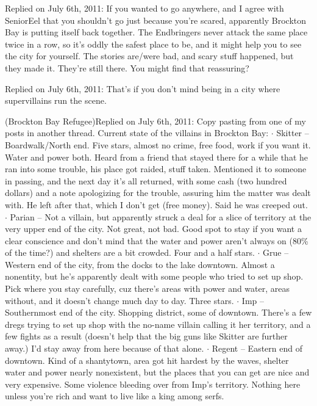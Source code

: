 \blacktriangleright  {}
Replied on July 6th, 2011:
If you wanted to go anywhere, and I agree with SeniorEel that you shouldn't go just because you're scared, apparently Brockton Bay is putting itself back together.  The Endbringers never attack the same place twice in a row, so it's oddly the safest place to be, and it might help you to see the city for yourself.  The stories are/were bad, and scary stuff happened, but they made it.  They're still there.  You might find that reassuring?



\blacktriangleright  {}
Replied on July 6th, 2011:
That's if you don't mind being in a city where supervillains run the scene.



\blacktriangleright {} (Brockton Bay Refugee)Replied on July 6th, 2011:
Copy pasting from one of my posts in another thread.  Current state of the villains in Brockton Bay:
$\cdot$  Skitter – Boardwalk/North end.  Five stars, almost no crime, free food, work if you want it.  Water and power both.  Heard from a friend that stayed there for a while that he ran into some trouble, his place got raided, stuff taken.  Mentioned it to someone in passing, and the next day it's all returned, with some cash (two hundred dollars) and a note apologizing for the trouble, assuring him the matter was dealt with.  He left after that, which I don't get (free money).  Said he was creeped out.
$\cdot$  Parian – Not a villain, but apparently struck a deal for a slice of territory at the very upper end of the city.  Not great, not bad.  Good spot to stay if you want a clear conscience and don't mind that the water and power aren't always on (80\% of the time?) and shelters are a bit crowded.  Four and a half stars.
$\cdot$  Grue – Western end of the city, from the docks to the lake downtown.  Almost a nonentity, but he's apparently dealt with some people who tried to set up shop.  Pick where you stay carefully, cuz there's areas with power and water, areas without, and it doesn't change much day to day.  Three stars.
$\cdot$  Imp – Southernmost end of the city.  Shopping district, some of downtown.  There's a few dregs trying to set up shop with the no-name villain calling it her territory, and a few fights as a result (doesn't help that the big guns like Skitter are further away.)  I'd stay away from here because of that alone.
$\cdot$  Regent – Eastern end of downtown.  Kind of a shantytown, area got hit hardest by the waves, shelter water and power nearly nonexistent, but the places that you can get are nice and very expensive.  Some violence bleeding over from Imp's territory.  Nothing here unless you're rich and want to live like a king among serfs.



